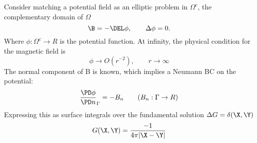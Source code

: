 \documentclass[11pt]{article}
\begin{document}
Consider matching a potential field as an elliptic problem in $\Omega^c$, the complementary domain of $\Omega$
\begin{equation}
  \B = -\DEL \phi, \qquad \Delta \phi = 0.
\end{equation}
Where $\phi: \Omega^c \rightarrow R$ is the potential function. At infinity, the physical condition for the magnetic field is
\begin{equation}
  \phi \rightarrow O(r^{-2}), \qquad r \rightarrow \infty
\end{equation}
The normal component of B is known, which implies a Neumann BC on the potential:
\begin{equation}
  \frac{\PD \phi}{\PD n}_{\Gamma} = - B_n \qquad (B_n: \Gamma \rightarrow R)
\end{equation}
Expressing this as surface integrals over the fundamental solution $\Delta G = \delta(\X,\Y)$
\begin{equation}
  G(\X,\Y) = \frac{-1}{4 \pi |\X-\Y|}
\end{equation}
\end{document}
